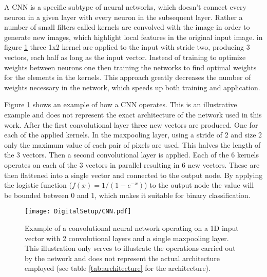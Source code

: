 \documentclass[main.tex]{subfiles}
\begin{document}
A CNN is a specific subtype of neural networks, which doesn't connect every neuron in a given layer with every neuron in the subsequent layer. Rather a number of small filters called kernels are convolved with the image in order to generate new images, which highlight local features in the original input image. in figure \ref{fig:CNN} three 1x2 kernel are applied to the input with stride two, producing 3 vectors, each half as long as the input vector. Instead of training to optimize weights between neurons one then training the networks to find optimal weights for the elements in the kernels. This approach greatly decreases the number of weights necessary in the network, which speeds up both training and application\cite[p.330]{Goodfellow-et-al-2016}.


Figure \ref{fig:CNN} shows an example of how a CNN operates. This is an illustrative example and does not represent the exact architecture of the network used in this work. After the first convolutional layer three new vectors are produced. One for each of the applied kernels. In the maxpooling layer, using a stride of 2 and size 2 only the maximum value of each pair of pixels are used. This halves the length of the 3 vectors. Then a second convolutional layer is applied. Each of the 6 kernels operates on each of the 3 vectors in parallel resulting in 6 new vectors. These are then flattened into a single vector and connected to the output node. By applying the logistic function ($f(x)=1/(1-e^{-x})$) to the output node the value will be bounded between 0 and 1, which makes it suitable for binary classification.

\begin{figure}[ht!]
    \centering
        \texttt{[image: DigitalSetup/CNN.pdf]}
        \caption[]{Example of a convolutional neural network operating on a 1D input vector with 2 convolutional layers and a single maxpooling layer. This illustration only serves to illustrate the operations carried out by the network and does not represent the actual architecture employed (see table \ref{tab:architecture} for the architecture).}
    \label{fig:CNN} 
\end{figure}
\end{document}
